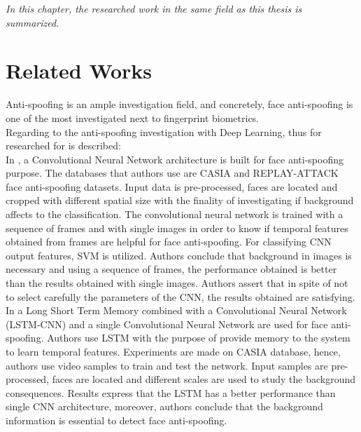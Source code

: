 
\begin{small}
\emph{In this chapter, the researched work in the same field as this thesis is summarized.}
\end{small}

\section{Related Works}
Anti-spoofing is an ample investigation field, and concretely, face anti-spoofing is one of the most investigated next to fingerprint biometrics.\\

Regarding to the anti-spoofing investigation with Deep Learning, thus for researched for is described:\\

In \cite{yangLL14}, a Convolutional Neural Network architecture is built for face anti-spoofing purpose.  The databases that authors use are CASIA and REPLAY-ATTACK face anti-spoofing datasets. Input data is pre-processed, faces are located and cropped with different spatial size with the finality of investigating if background affects to the classification. The convolutional neural network is trained with a sequence of frames and with single images in order to know if temporal features obtained from frames are helpful for face anti-spoofing. For classifying CNN output features, SVM is utilized. Authors conclude that background in images is necessary and using a sequence of frames, the performance obtained is better than the results obtained with single images. Authors assert that in spite of not to select carefully the parameters of the CNN, the results obtained are satisfying. \\

In \cite{LSTM-CNN} a Long Short Term Memory combined with a Convolutional Neural Network (LSTM-CNN) and a single Convolutional Neural Network are used for face anti-spoofing. Authors use LSTM with the purpose of provide memory to the system to learn temporal features. Experiments are made on CASIA database, hence, authors use video samples to train and test the network. Input samples are pre-processed, faces are located and different scales are used to study the background consequences. Results express that the LSTM has a better performance than single CNN architecture, moreover, authors conclude that the background information is essential to detect face anti-spoofing.\\

